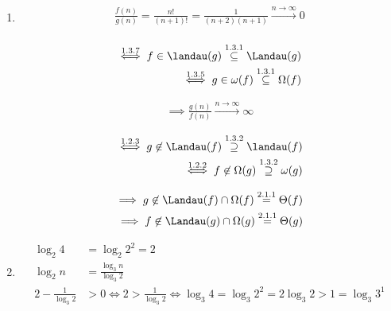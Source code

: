 \begin{solution}

\phantom{}

\begin{comment}

\includegraphicsboxed{Definition 1-4.png}
\includegraphicsboxed{Definition 1-5.png}
\includegraphicsboxed{Lemma 1-2.png}
\includegraphicsboxed{Lemma 1-3.png}

\end{comment}

\begin{enumerate}[label = (\alph*)]

  \item

  \begin{align*}
    \frac{f(n)}{g(n)} = \frac{n!}{(n+1)!} = \frac{1}{(n+2)(n+1)} \xrightarrow{n \to \infty} 0 \\
  \end{align*}

  \begin{align*}
    \stackrel{1.3.7}{\iff}
    f \in \landau(g)
    \stackrel{1.3.1}{\subseteq}
    \Landau(g) \\
    \stackrel{1.3.5}{\iff}
    g \in \omega(f)
    \stackrel{1.3.1}{\subseteq}
    \Omega(f)
  \end{align*}

  \begin{align*}
    \implies
    \frac{g(n)}{f(n)} \xrightarrow{n \to \infty} \infty
  \end{align*}

  \begin{align*}
    \stackrel{1.2.3}{\iff}
    g \not \in \Landau(f)
    \stackrel{1.3.2}{\supseteq}
    \landau(f) \\
    \stackrel{1.2.2}{\iff}
    f \not \in \Omega(g)
    \stackrel{1.3.2}{\supseteq}
    \omega(g)
  \end{align*}

  \begin{align*}
    \implies
    g
    \not \in
    \Landau(f) \cap \Omega(f)
    \stackrel{2.1.1}{=}
    \Theta(f) \\
    \implies
    f
    \not \in
    \Landau(g) \cap \Omega(g)
    \stackrel{2.1.1}{=}
    \Theta(g)
  \end{align*}

  \item

  \begin{align*}
    \log_2{4}               & = \log_2{2^2} = 2 \\
    \log_2{n}               & = \frac{\log_3{n}}{\log_3{2}} \\
    2 - \frac{1}{\log_3{2}} & > 0 \iff 2 > \frac{1}{\log_3{2}} \iff \log_3{4} = \log_3{2^2} = 2 \log_3{2} > 1 = \log_3{3^1}
  \end{align*}


\end{enumerate}
\end{solution}
